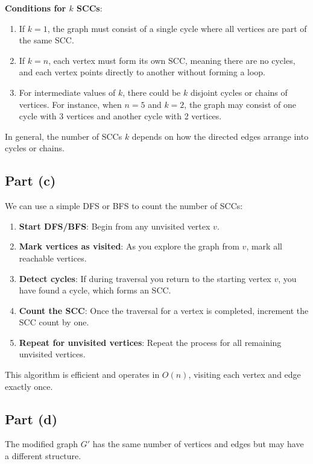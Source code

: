 \documentclass[11pt]{article}
\begin{document}
\textbf{Conditions for \( k \) SCCs}:
\begin{enumerate}
    \item If \( k = 1 \), the graph must consist of a single cycle where all vertices are part of the same SCC.
    \item If \( k = n \), each vertex must form its own SCC, meaning there are no cycles, and each vertex points directly to another without forming a loop.
    \item For intermediate values of \( k \), there could be \( k \) disjoint cycles or chains of vertices. For instance, when \( n = 5 \) and \( k = 2 \), the graph may consist of one cycle with 3 vertices and another cycle with 2 vertices.
\end{enumerate}

In general, the number of SCCs \( k \) depends on how the directed edges arrange into cycles or chains.

\subsection*{Part (c)}

We can use a simple DFS or BFS to count the number of SCCs:

\begin{enumerate}
    \item \textbf{Start DFS/BFS}: Begin from any unvisited vertex \( v \).
    \item \textbf{Mark vertices as visited}: As you explore the graph from \( v \), mark all reachable vertices.
    \item \textbf{Detect cycles}: If during traversal you return to the starting vertex \( v \), you have found a cycle, which forms an SCC.
    \item \textbf{Count the SCC}: Once the traversal for a vertex is completed, increment the SCC count by one.
    \item \textbf{Repeat for unvisited vertices}: Repeat the process for all remaining unvisited vertices.
\end{enumerate}

This algorithm is efficient and operates in \( O(n) \), visiting each vertex and edge exactly once.

\subsection*{Part (d)}

The modified graph \( G' \) has the same number of vertices and edges but may have a different structure.
\end{document}
